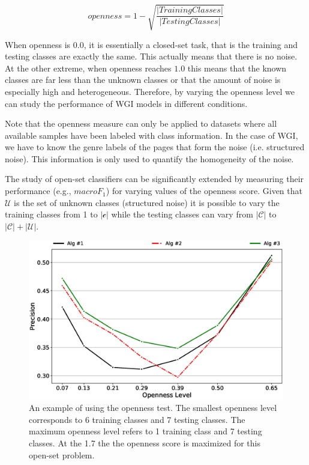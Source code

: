 \begin{equation}\label{chap:eval_methods:eq:openness}
	openness=1-\sqrt{\frac{ | Training Classes | }{ |Testing Classes | }}
\end{equation}

When openness is $0.0$, it is essentially a closed-set task, that is the training and testing classes are exactly the same. This actually means that there is no noise. At the other extreme, when openness reaches $1.0$ this means that the known classes are far less than the unknown classes or that the amount of noise is especially high and heterogeneous. Therefore, by varying the openness level we can study the performance of WGI models in different conditions.

Note that the openness measure can only be applied to datasets where all available samples have been labeled with class information. In the case of WGI, we have to know the genre labels of the pages that form the noise (i.e. structured noise). This information is only used to quantify the homogeneity of the noise.

The study of open-set classifiers can be significantly extended by measuring their performance (e.g., $macro F_{1}$) for varying values of the openness score. Given that $\mathcal{U}$ is the set of unknown classes (structured noise) it is possible to vary the training classes from 1 to $|\mathcal{c}|$ while the testing classes can vary from $|\mathcal{C}|$ to $|\mathcal{C}|+|\mathcal{U}|$. 

\begin{figure}[t]
	\begin{center}
    	\includegraphics[scale=0.50]{Figures/openness_example.eps}
		\caption{An example of using the openness test. The smallest openness level corresponds to 6 training classes and 7 testing classes. The maximum openness level refers to 1 training class and 7 testing classes. At the 1.7 the the openness score is maximized for this open-set problem.}
		\label{chap:eval_methods:fig:openness}
	\end{center}
\end{figure}

